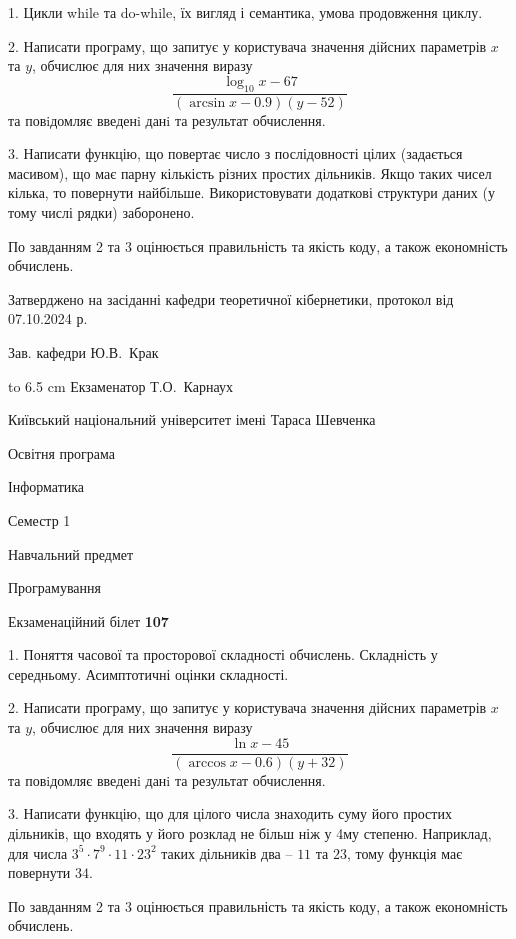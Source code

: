 \documentclass[12pt, ukrainian]{article}
\begin{document}
{%
1. Цикли while та do-while, їх вигляд і семантика, умова продовження циклу.%
\par
2. Написати програму, що запитує у користувача значення дійсних параметрів $x$ та $y$, обчислює для них значення виразу 
$$\frac{\log_{10} x - 67}{(\arcsin x - 0.9) (y - 52)}$$ 
та повiдомляє введенi данi та результат обчислення.

\par
3. Написати функцію, що повертає число з послідовності цілих (задається масивом), що має парну кількість різних простих дільників. Якщо таких чисел кілька, то повернути найбільше. Використовувати додаткові структури даних (у тому числі рядки) заборонено.

По завданням 2 та 3 оцінюється правильність та якість коду, а також економність обчислень.

}
{\smallskip\smallskip \begin {scriptsize} Затверджено на засіданні кафедри теоретичної кібернетики, протокол   від   07.10.2024 р.\par\smallskip\smallskip\smallskip\smallskip
{\parbox {6.5 cm} {Зав. кафедри \dotfill Ю.В.~Крак}}\hspace {0.7cm} {\hbox to 6.5 cm { Екзаменатор \dotfill Т.О.~Карнаух}} \end{scriptsize}}
\vspace{0.9cm}
{{\begin {scriptsize}\par
{ \center  Київський національний університет імені Тараса Шевченка \par}
{\parbox {5 cm}{Освітня програма \hfill}{\parbox {7 cm}{Інформатика\hfill}}\parbox {6 cm}{\hfill Семестр 1}}\par
{\parbox {5 cm} {Навчальний предмет \hfill}\parbox {7 cm}{Програмування \hfill}\parbox {6cm}{\hfill}\par}\vspace{-15pt} \end{scriptsize}}{\center Екзаменаційний білет \No \textbf { 107 }\par}}
{%
1. Поняття часової та просторової складності обчислень. Складність у середньому. Асимптотичні оцінки складності.%
\par
2. Написати програму, що запитує у користувача значення дійсних параметрів $x$ та $y$, обчислює для них значення виразу 
$$\frac{\ln x - 45}{(\arccos x - 0.6) (y + 32)}$$ 
та повiдомляє введенi данi та результат обчислення.

\par
3. Написати функцію, що для цілого числа знаходить суму його простих дільників, що входять у його розклад не більш ніж у 4му степеню. Наприклад, для числа $3^5{\cdot}7^9{\cdot}11{\cdot}23^{2}$ таких дільників два – $11$ та $23$, тому функція має повернути $34$.

По завданням 2 та 3 оцінюється правильність та якість коду, а також економність обчислень.

}
\end{document}
